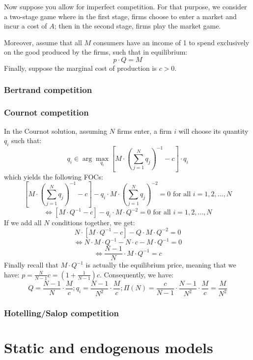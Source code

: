Now suppose you allow for imperfect competition. For that purpose, we consider a two-stage game where in the first stage, firms choose to enter a market and incur a cost of $A$; then in the second stage, firms play the market game.

Moreover, assume that all $M$ consumers have an income of 1 to spend exclusively on the good produced by the firms, such that in equilibrium: $$p\cdot Q = M$$
Finally, suppose the marginal cost of production is $c>0$.

\subsubsection{Bertrand competition}



\subsubsection{Cournot competition}

In the Cournot solution, assuming $N$ firms enter, a firm $i$ will choose its quantity $q_i$ such that: $$q_i \in \arg\max_{q_i} \left[M\cdot\left(\sum_{j=1}^{N} q_j\right)^{-1} - c\right]\cdot q_i $$ which yields the following FOCs: $$\left[M\cdot\left(\sum_{j=1}^{N} q_j\right)^{-1} - c\right] - q_i\cdot M \cdot \left(\sum_{j=1}^{N} q_j\right)^{-2} = 0 \text{ for all } i = 1, 2, ..., N $$
$$\Leftrightarrow \left[M\cdot Q^{-1} - c\right] - q_i\cdot M \cdot Q^{-2} = 0 \text{ for all } i = 1, 2, ..., N $$ If we add all $N$ conditions together, we get: $$ N\cdot\left[M\cdot Q^{-1} - c\right] - Q \cdot M \cdot Q^{-2} = 0 $$ $$\Leftrightarrow N \cdot M\cdot Q^{-1} - N \cdot c - M \cdot Q^{-1} = 0 $$ $$\Leftrightarrow \frac{N - 1}{N} \cdot M\cdot Q^{-1} = c $$
Finally recall that $M\cdot Q^{-1}$ is actually the equilibrium price, meaning that we have: $p = \frac{N}{N-1} c = (1 + \frac{1}{N-1})c $. Consequently, we have: $$Q = \frac{N - 1}{N} \cdot \frac{M}{c}; q_i = \frac{N - 1}{N^2} \cdot \frac{M}{c}; \Pi(N) = \frac{c}{N-1}\cdot \frac{N - 1}{N^2} \cdot \frac{M}{c} = \frac{M}{N^2} $$



\subsubsection{Hotelling/Salop competition}



\section{Static and endogenous models}

